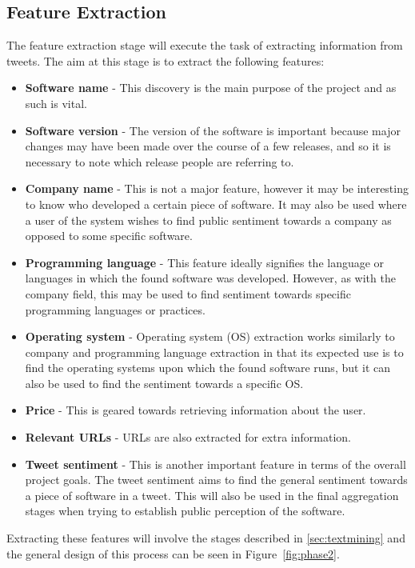 \subsection{Feature Extraction}
\label{sec:arc2}
The feature extraction stage will execute the task of extracting information from tweets. The aim at this stage is to extract the following features:

\begin{itemize}
\item \textbf{Software name} - This discovery is the main purpose of the project and as such is vital.
\item \textbf{Software version} - The version of the software is important because major changes may have been made over the course of a few releases, and so it is necessary to note which release people are referring to.
\item \textbf{Company name} -  This is not a major feature, however it may be interesting to know who developed a certain piece of software. It may also be used where a user of the system wishes to find public sentiment towards a company as opposed to some specific software.
\item \textbf{Programming language} - This feature ideally signifies the language or languages in which the found software was developed. However, as with the company field, this may be used to find sentiment towards specific programming languages or practices.
\item \textbf{Operating system} - Operating system (OS) extraction works similarly to company and programming language extraction in that its expected use is to find the operating systems upon which the found software runs, but it can also be used to find the sentiment towards a specific OS.
\item \textbf{Price} - This is geared towards retrieving information about the user.
\item \textbf{Relevant URLs} - URLs are also extracted for extra information.
\item \textbf{Tweet sentiment} - This is another important feature in terms of the overall project goals. The tweet sentiment aims to find the general sentiment towards a piece of software in a tweet. This will also be used in the final aggregation stages when trying to establish public perception of the software.
\end{itemize}

Extracting these features will involve the stages described in \ref{sec:textmining} and the general design of this process can be seen in Figure~\ref{fig:phase2}. 

